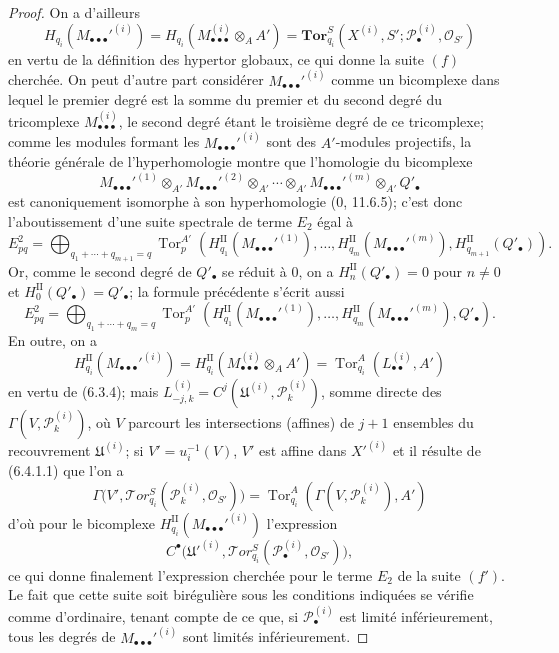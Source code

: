 \begin{proof}
On a d'ailleurs
\[
  H_{q_i}(M_{\bullet\bullet\bullet}'^{(i)})
  =H_{q_i}(M_{\bullet\bullet\bullet}^{(i)}\otimes_A A')
  =\mathbf{Tor}_{q_i}^S
  (X^{(i)},S';\mathscr P_\bullet^{(i)},\mathscr O_{S'})
\]
en vertu de la définition des hypertor globaux, ce qui donne la suite $(f)$
cherchée. On peut d'autre part considérer
$M_{\bullet\bullet\bullet}'^{(i)}$ comme un bicomplexe dans lequel le premier
degré est la somme du premier et du second degré du tricomplexe
$M_{\bullet\bullet\bullet}^{(i)}$, le second degré étant le troisième degré
de ce tricomplexe; comme les modules formant les
$M_{\bullet\bullet\bullet}'^{(i)}$ sont des $A'$-modules projectifs, la théorie
générale de l'hyperhomologie montre que l'homologie du bicomplexe
\[
  M_{\bullet\bullet\bullet}'^{(1)}\otimes_{A'}
  M_{\bullet\bullet\bullet}'^{(2)}\otimes_{A'}\cdots\otimes_{A'}
  M_{\bullet\bullet\bullet}'^{(m)}\otimes_{A'} Q'_\bullet
\]
est canoniquement isomorphe à son hyperhomologie (0, 11.6.5); c'est donc
l'aboutissement d'une suite spectrale de terme $E_2$ égal à
\[
  E_{pq}^2
  =\bigoplus_{q_1+\cdots+q_{m+1}=q}
  \operatorname{Tor}_p^{A'}
  (H_{q_1}^{\mathrm{II}}(M_{\bullet\bullet\bullet}'^{(1)}),\ldots,
   H_{q_m}^{\mathrm{II}}(M_{\bullet\bullet\bullet}'^{(m)}),
   H_{q_{m+1}}^{\mathrm{II}}(Q'_\bullet)).
\]
Or, comme le second degré de $Q'_\bullet$ se réduit à $0$, on a
$H_n^{\mathrm{II}}(Q'_\bullet)=0$ pour $n\ne0$ et
$H_0^{\mathrm{II}}(Q'_\bullet)=Q'_\bullet$; la formule précédente s'écrit
aussi
\[
  E_{pq}^2
  =\bigoplus_{q_1+\cdots+q_m=q}
  \operatorname{Tor}_p^{A'}
  (H_{q_1}^{\mathrm{II}}(M_{\bullet\bullet\bullet}'^{(1)}),\ldots,
   H_{q_m}^{\mathrm{II}}(M_{\bullet\bullet\bullet}'^{(m)}),Q'_\bullet).
\]
En outre, on a
\[
  H_{q_i}^{\mathrm{II}}(M_{\bullet\bullet\bullet}'^{(i)})
  =H_{q_i}^{\mathrm{II}}(M_{\bullet\bullet\bullet}^{(i)}\otimes_A A')
  =\operatorname{Tor}_{q_i}^A(L_{\bullet\bullet}^{(i)},A')
\]
en vertu de (6.3.4); mais
$L_{-j,k}^{(i)}=C^j(\mathfrak U^{(i)},\mathscr P_k^{(i)})$, somme directe des
$\Gamma(V,\mathscr P_k^{(i)})$, où $V$ parcourt les intersections (affines) de
$j+1$ ensembles du recouvrement $\mathfrak U^{(i)}$; si
$V'=u_i^{-1}(V)$, $V'$ est affine dans $X'^{(i)}$ et il résulte de (6.4.1.1)
que l'on a
\[
  \Gamma\bigl(V',\mathscr{T}\!or_{q_i}^S
  (\mathscr P_k^{(i)},\mathscr O_{S'})\bigr)
  =\operatorname{Tor}_{q_i}^A(\Gamma(V,\mathscr P_k^{(i)}),A')
\]
d'où pour le bicomplexe
$H_{q_i}^{\mathrm{II}}(M_{\bullet\bullet\bullet}'^{(i)})$ l'expression
\[
  C^\bullet\bigl(\mathfrak U'^{(i)},
  \mathscr{T}\!or_{q_i}^S(\mathscr P_\bullet^{(i)},\mathscr O_{S'})\bigr),
\]
ce qui donne finalement l'expression cherchée pour le terme $E_2$ de la
suite $(f')$. Le fait que cette suite soit birégulière sous les conditions
indiquées se vérifie comme d'ordinaire, tenant compte de ce que, si
$\mathscr P_\bullet^{(i)}$ est limité inférieurement, tous les degrés de
$M_{\bullet\bullet\bullet}'^{(i)}$ sont limités inférieurement.
\end{proof}

